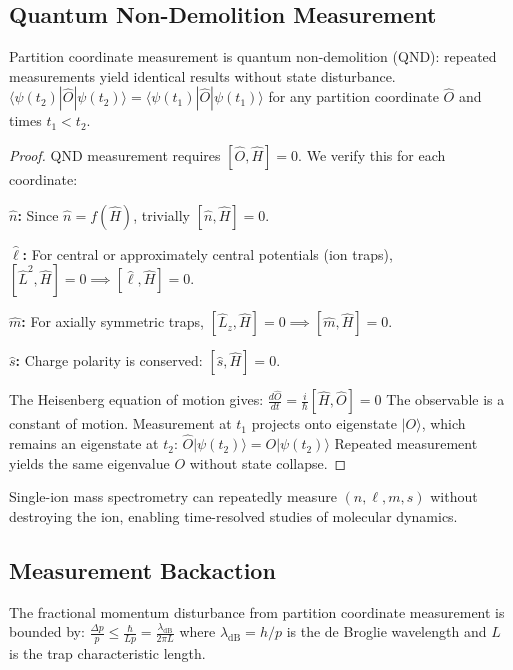 \subsection{Quantum Non-Demolition Measurement}

\begin{theorem}
\label{thm:qnd}
Partition coordinate measurement is quantum non-demolition (QND): repeated measurements yield identical results without state disturbance.
$
\langle \psi(t_2) | \hat{O} | \psi(t_2) \rangle = \langle \psi(t_1) | \hat{O} | \psi(t_1) \rangle
$
for any partition coordinate $\hat{O}$ and times $t_1 < t_2$.
\end{theorem}

\begin{proof}
QND measurement requires $[\hat{O}, \hat{H}] = 0$. We verify this for each coordinate:

\textbf{$\hat{n}$:} Since $\hat{n} = f(\hat{H})$, trivially $[\hat{n}, \hat{H}] = 0$.

\textbf{$\hat{\ell}$:} For central or approximately central potentials (ion traps), $[\hat{L}^2, \hat{H}] = 0 \implies [\hat{\ell}, \hat{H}] = 0$.

\textbf{$\hat{m}$:} For axially symmetric traps, $[\hat{L}_z, \hat{H}] = 0 \implies [\hat{m}, \hat{H}] = 0$.

\textbf{$\hat{s}$:} Charge polarity is conserved: $[\hat{s}, \hat{H}] = 0$.

The Heisenberg equation of motion gives:
$
\frac{d\hat{O}}{dt} = \frac{i}{\hbar}[\hat{H}, \hat{O}] = 0
$
The observable is a constant of motion. Measurement at $t_1$ projects onto eigenstate $|O\rangle$, which remains an eigenstate at $t_2$:
$
\hat{O}|\psi(t_2)\rangle = O|\psi(t_2)\rangle
$
Repeated measurement yields the same eigenvalue $O$ without state collapse.
\end{proof}

\begin{corollary}
\label{cor:nondestructive}
Single-ion mass spectrometry can repeatedly measure $(n, \ell, m, s)$ without destroying the ion, enabling time-resolved studies of molecular dynamics.
\end{corollary}

\subsection{Measurement Backaction}

\begin{theorem}
\label{thm:backaction}
The fractional momentum disturbance from partition coordinate measurement is bounded by:
$
\frac{\Delta p}{p} \leq \frac{\hbar}{Lp} = \frac{\lambda_{\mathrm{dB}}}{2\pi L}
$
where $\lambda_{\mathrm{dB}} = h/p$ is the de Broglie wavelength and $L$ is the trap characteristic length.
\end{theorem}

